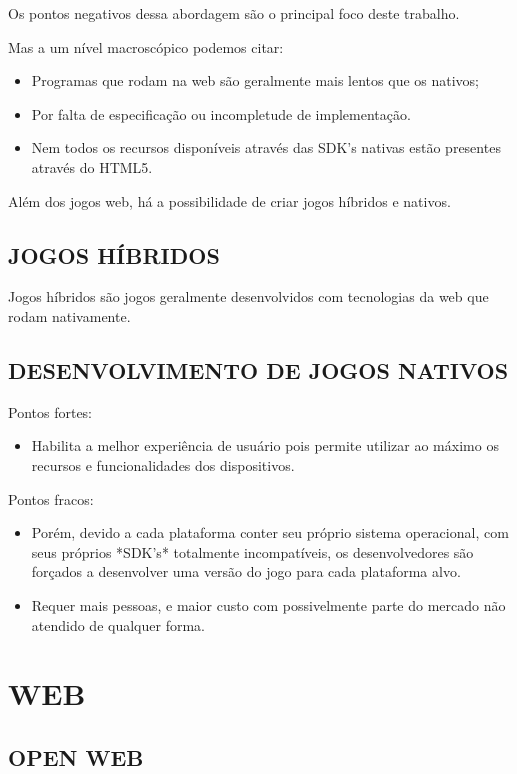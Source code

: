 \documentclass[
12pt,
a4paper,
portuges,
draft
]{report}
\begin{document}
Os pontos negativos dessa abordagem são o principal foco deste trabalho.

Mas a um nível macroscópico podemos citar:
\begin{itemize}
\item Programas que rodam na web são geralmente mais lentos que os
nativos;
\item Por falta de especificação ou incompletude de implementação.
\item Nem todos os recursos disponíveis através das SDK's nativas estão presentes através do HTML5.
\end{itemize}

Além dos jogos web, há a possibilidade de criar jogos híbridos e nativos.

\subsection{JOGOS HÍBRIDOS}

Jogos híbridos são jogos geralmente desenvolvidos com tecnologias da
web que rodam nativamente.

\subsection{DESENVOLVIMENTO DE JOGOS NATIVOS}

Pontos fortes:
\begin{itemize}
\item Habilita a melhor experiência de usuário pois permite utilizar ao
máximo os recursos e funcionalidades dos dispositivos.
\end{itemize}

Pontos fracos:
\begin{itemize}
\item Porém, devido a cada plataforma conter seu próprio sistema operacional,
com seus próprios *SDK's* totalmente incompatíveis, os desenvolvedores são
forçados a desenvolver uma versão do jogo para cada plataforma alvo.
\item Requer mais pessoas, e maior custo com possivelmente parte do mercado não atendido de qualquer forma.
\end{itemize}


\section{WEB}

\subsection{OPEN WEB}
\end{document}

